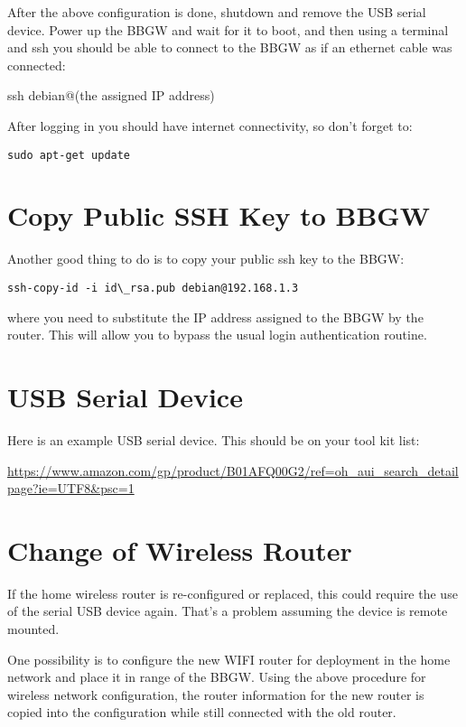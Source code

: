 After the above configuration is done, shutdown and remove the USB serial 
device.
Power up the BBGW and wait for it to boot, and then using a terminal and ssh 
you should be able to connect to the BBGW as if an ethernet cable was connected:

ssh debian@(the assigned IP address)

After logging in you should have internet connectivity, so don't forget to:

\begin{verbatim}
sudo apt-get update
\end{verbatim}

\section{Copy Public SSH Key to BBGW}

Another good thing to do is to copy your public ssh key to the BBGW:

\begin{verbatim}
ssh-copy-id -i id\_rsa.pub debian@192.168.1.3
\end{verbatim}

where you need to substitute the IP address assigned to the BBGW by the 
router.  This will allow you to bypass the usual login authentication routine.

\section{USB Serial Device}

Here is an example USB serial device.  This should be on your tool kit list:

\url{https://www.amazon.com/gp/product/B01AFQ00G2/ref=oh_aui_search_detailpage?ie=UTF8&psc=1}

\section{Change of Wireless Router}

If the home wireless router is re-configured or replaced, this could require 
the use of the serial USB device again.  That's a problem assuming the device 
is remote mounted.

One possibility is to configure the new WIFI router for deployment in the home 
network and place it in range of the BBGW.  Using the above procedure for 
wireless network configuration, the router information for the new router is 
copied into the configuration while still connected with the old router.

